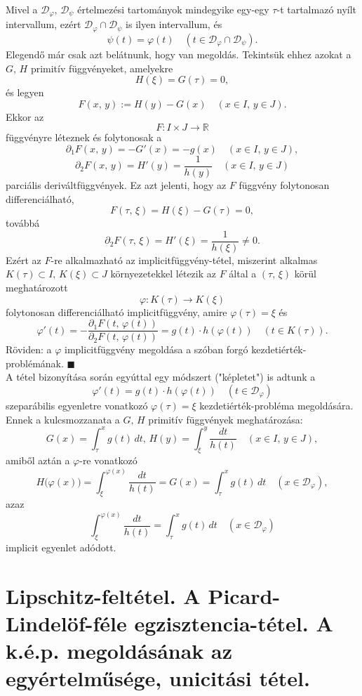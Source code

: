 \documentclass[12pt]{article}
\newcommand{\R}{\mathbb{R}}
\newcommand{\Dp}{\mathcal{D}_\varphi}
\begin{document}
    Mivel a $\Dp, \, \mathcal{D}_\psi$ értelmezési tartományok mindegyike egy-egy $\tau$-t tartalmazó nyílt intervallum, ezért $\Dp \cap \mathcal{D}_\psi$ is ilyen intervallum, és
    \[
        \psi(t) = \varphi(t) \quad (t \in \Dp \cap \mathcal{D}_\psi).
    \]
    Elegendő már csak azt belátnunk, hogy van megoldás. Tekintsük ehhez azokat a $G, \, H$ primitív függvényeket, amelyekre
    \[
        H(\xi) = G(\tau) = 0,
    \]
    és legyen
    \[
        F(x, \, y) := H(y) - G(x) \quad (x \in I, \, y \in J).
    \]
    Ekkor az
    \[
        F : I \times J \to \R
    \]
    függvényre léteznek és folytonosak a
    \[
        \partial_1 F(x, \, y) = -G'(x) = -g(x) \quad (x \in I, \, y \in J),
    \]
    \[
        \partial_2 F(x, \, y) = H'(y) = \frac{1}{h(y)} \quad (x \in I, \, y \in J)
    \]
    parciális deriváltfüggvények. Ez azt jelenti, hogy az $F$ függvény folytonosan differenciálható,
    \[
        F(\tau, \, \xi) = H(\xi) - G(\tau) = 0,
    \]
    továbbá
    \[
        \partial_2 F(\tau, \, \xi) = H'(\xi) = \frac{1}{h(\xi)} \neq 0.
    \]
    Ezért az $F$-re alkalmazható az implicitfüggvény-tétel, miszerint alkalmas $K(\tau) \subset I, \, K(\xi) \subset J$ környezetekkel létezik az $F$ által a $(\tau, \, \xi)$ körül meghatározott
    \[
        \varphi : K(\tau) \to K(\xi)
    \]
    folytonosan differenciálható implicitfüggvény, amire $\varphi(\tau) = \xi$ és
    \[
        \varphi'(t) = -\frac{\partial_1 F(t, \, \varphi(t))}{\partial_2 F(t, \, \varphi(t))} = g(t) \cdot h(\varphi(t)) \quad (t \in K(\tau)).
    \]
    Röviden: a $\varphi$ implicitfüggvény megoldása a szóban forgó kezdetiérték-problémának. $\blacksquare$\\

    A tétel bizonyítása során egyúttal egy módszert ("képletet") is adtunk a
    \[
        \varphi'(t) = g(t) \cdot h(\varphi(t)) \quad (t \in \Dp)
    \]
    szeparábilis egyenletre vonatkozó $\varphi(\tau) =\xi$ kezdetiérték-probléma megoldására. Ennek a kulcsmozzanata a $G, \, H$ primitív függvények meghatározása:
    \[
        G(x) = \int_\tau^x g(t) \, dt, \, H(y) = \int_\xi^y \frac{dt}{h(t)} \quad (x \in I, \, y \in J),
    \]
    amiből aztán a $\varphi$-re vonatkozó
    \[
        H\big( \varphi(x) \big) = \int_\xi^{\varphi(x)} \frac{dt}{h(t)} = G(x) = \int_\tau^x g(t) \, dt \quad (x \in \Dp),
    \]
    azaz
    \[
        \int_\xi^{\varphi(x)} \frac{dt}{h(t)} = \int_\tau^x g(t) \, dt \quad (x \in \Dp)
    \]
    implicit egyenlet adódott.

    \newpage
    \section{Lipschitz-feltétel. A Picard-Lindelöf-féle egzisztencia-tétel. A k.é.p. megoldásának az egyértelműsége, unicitási tétel.}
\end{document}
